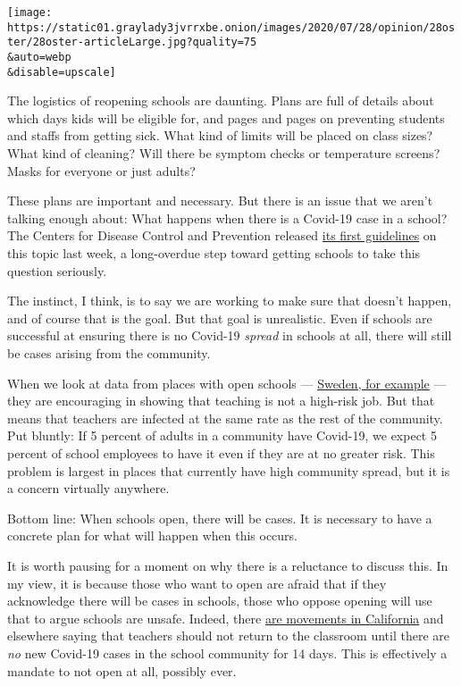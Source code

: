 \texttt{[image: https://static01.graylady3jvrrxbe.onion/images/2020/07/28/opinion/28oster/28oster-articleLarge.jpg?quality=75\\\&auto=webp\\\&disable=upscale]}

The logistics of reopening schools are daunting. Plans are full of
details about which days kids will be eligible for, and pages and pages
on preventing students and staffs from getting sick. What kind of limits
will be placed on class sizes? What kind of cleaning? Will there be
symptom checks or temperature screens? Masks for everyone or just
adults?

These plans are important and necessary. But there is an issue that we
aren't talking enough about: What happens when there is a Covid-19 case
in a school? The Centers for Disease Control and Prevention released
\href{https://www.cdc.gov/coronavirus/2019-ncov/community/schools-childcare/prepare-safe-return.html}{its
first guidelines} on this topic last week, a long-overdue step toward
getting schools to take this question seriously.

The instinct, I think, is to say we are working to make sure that
doesn't happen, and of course that is the goal. But that goal is
unrealistic. Even if schools are successful at ensuring there is no
Covid-19 \emph{spread} in schools at all, there will still be cases
arising from the community.

When we look at data from places with open schools ---
\href{https://www.bloomberg.com/news/articles/2020-07-19/covid-s-spread-in-schools-is-questioned-in-latest-nordic-study}{Sweden,
for example} --- they are encouraging in showing that teaching is not a
high-risk job. But that means that teachers are infected at the same
rate as the rest of the community. Put bluntly: If 5 percent of adults
in a community have Covid-19, we expect 5 percent of school employees to
have it even if they are at no greater risk. This problem is largest in
places that currently have high community spread, but it is a concern
virtually anywhere.

Bottom line: When schools open, there will be cases. It is necessary to
have a concrete plan for what will happen when this occurs.

It is worth pausing for a moment on why there is a reluctance to discuss
this. In my view, it is because those who want to open are afraid that
if they acknowledge there will be cases in schools, those who oppose
opening will use that to argue schools are unsafe. Indeed, there
\href{https://www.facebookcorewwwi.onion/refusetoreturn/}{are movements
in California} and elsewhere saying that teachers should not return to
the classroom until there are \emph{no} new Covid-19 cases in the school
community for 14 days. This is effectively a mandate to not open at all,
possibly ever.

